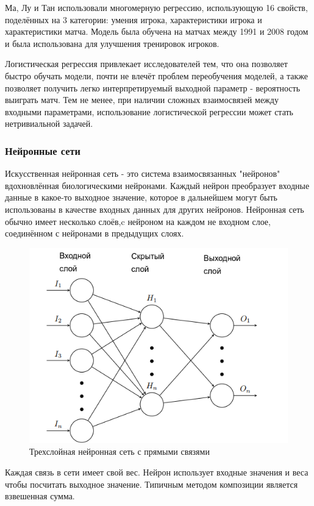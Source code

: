 Ма, Лу и Тан\cite{Book11} использовали многомерную регрессию, использующую 16 свойств, поделённых на 3 категории: умения игрока, характеристики игрока и характеристики матча. Модель была обучена на матчах между 1991 и 2008 годом и была использована для улучшения тренировок игроков.

Логистическая регрессия привлекает исследователей тем, что она позволяет быстро обучать модели, почти не влечёт проблем переобучения моделей, а также позволяет получить легко интерпретируемый выходной параметр - вероятность выиграть матч. Тем не менее, при наличии сложных взаимосвязей между входными параметрами, использование логистической регрессии может стать нетривиальной задачей.

\subsubsection{Нейронные сети}
Искусственная  нейронная сеть - это система взаимосвязанных "нейронов"\, вдохновлённая биологическими нейронами. Каждый нейрон преобразует входные данные в какое-то выходное значение, которое в дальнейшем могут быть использованы в качестве входных данных для других нейронов. Нейронная сеть обычно имеет несколько слоёв,c нейроном на каждом не входном слое, соединённом с нейронами в предыдущих слоях.
\begin{figure}[!h]
	\centering
	\includegraphics[width=.9\textwidth]{master_img/img1_edited.png}
	\caption{Трехслойная нейронная сеть с прямыми связями}
	\label{fig01}
\end{figure}
Каждая связь в сети имеет свой вес. Нейрон использует входные значения и веса чтобы посчитать выходное значение. Типичным методом композиции является  взвешенная сумма.

